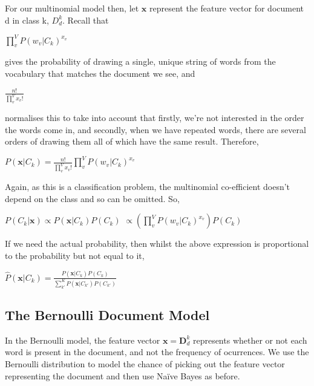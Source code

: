 \documentclass[10pt,a4paper]{article}
\newcommand{\su}[2]{\sum\limits_{#1}^{#2}}
\begin{document}
		For our multinomial model then, let $\bm x$ represent the feature vector for document d in class k, $D^k_d$. Recall that 
		\begin{center}
			$
			\prod\limits_v^V P(w_v|C_k)^{x_v}
			$
		\end{center}
		
		gives the probability of drawing a single, unique string of words from the vocabulary that matches the document we see, and 
		
		\begin{center}
			$ \frac{n!}{\prod\limits_v^V x_v!}  $
		\end{center}
		
		normalises this to take into account that firstly, we're not interested in the order the words come in, and secondly, when we have repeated words, there are several orders of drawing them all of which have the same result. Therefore,
		
		
		\begin{center}
		{ \LARGE	$
			P(\bm x|C_k) = \frac{n!}{\prod\limits_v^V x_v!} 	\prod\limits_v^V P(w_v|C_k)^{x_v}
			$ }
		\end{center}
		
		Again, as this is a classification problem, the multinomial co-efficient doesn't depend on the class and so can be omitted. So, 
		
		\begin{center}
			$ P(C_k|\bm x) \propto P(\bm x|C_k)P(C_k) $
			$ \propto (\prod\limits_v^V P(w_v|C_k)^{x_v} )P(C_k)$
		\end{center}
		
		If we need the actual probability, then whilst the above expression is proportional to the probability but not equal to it, 
		
		\begin{center}
			{\Large $ \hat{P}(\bm x|C_k) = \frac{P(\bm x|C_k)P(C_k)}{\su{k'}{K}P(\bm x|C_{k'})P(C_{k'})}$}
		\end{center}
		
		
		\subsection{The Bernoulli Document Model}
		
		In the Bernoulli model, the feature vector $\bm x = \bm D^k_d$ represents whether or not each word is present in the document, and not the frequency of ocurrences. We use the Bernoulli distribution to model the chance of picking out the feature vector representing the document and then use Naïve Bayes as before.
		
\end{document}
